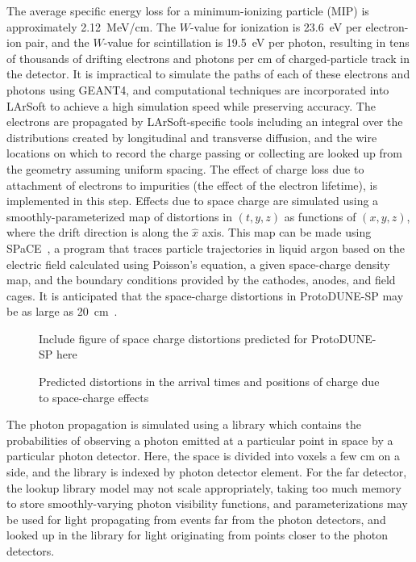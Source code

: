The average specific energy loss for a minimum-ionizing particle (MIP)
is approximately 2.12~MeV/cm.  The $W$-value for ionization is 23.6~eV
per electron-ion pair, and the $W$-value for scintillation is 19.5~eV
per photon, resulting in tens of thousands of drifting electrons and
photons per cm of charged-particle track in the detector.  It is
impractical to simulate the paths of each of these electrons and
photons using GEANT4, and computational techniques are incorporated
into LArSoft to achieve a high simulation speed while preserving
accuracy.  The electrons are propagated by LArSoft-specific tools
including an integral over the distributions created by longitudinal
and transverse diffusion, and the wire locations on which to record
the charge passing or collecting are looked up from the geometry
assuming uniform spacing.  The effect of charge loss due to attachment
of electrons to impurities (the effect of the electron lifetime), is
implemented in this step.  Effects due to space charge are simulated
using a smoothly-parameterized map of distortions in $(t,y,z)$ as
functions of $(x,y,z)$, where the drift direction is along the
${\hat{x}}$ axis.  This map can be made using SPaCE~\cite{space}, a
program that traces particle trajectories in liquid argon based on the
electric field calculated using Poisson's equation, a given
space-charge density map, and the boundary conditions provided by the
cathodes, anodes, and field cages.  It is anticipated that the
space-charge distortions in ProtoDUNE-SP may be as large as
20~cm~\cite{space}.  

\begin{figure}[htb]
\centering
Include figure of space charge distortions predicted for ProtoDUNE-SP
here
\caption{Predicted distortions in the arrival times and positions of
  charge due to space-charge effects~\protect\cite{space}}
\label{fig:spacecharge}
\end{figure}


The photon propagation is simulated using a library which contains the
probabilities of observing a photon emitted at a particular point in
space by a particular photon detector.  Here, the space is divided
into voxels a few cm on a side, and the library is indexed by photon
detector element.  For the far detector, the lookup library model may
not scale appropriately, taking too much memory to store
smoothly-varying photon visibility functions, and parameterizations
may be used for light propagating from events far from the photon
detectors, and looked up in the library for light originating from
points closer to the photon detectors.

